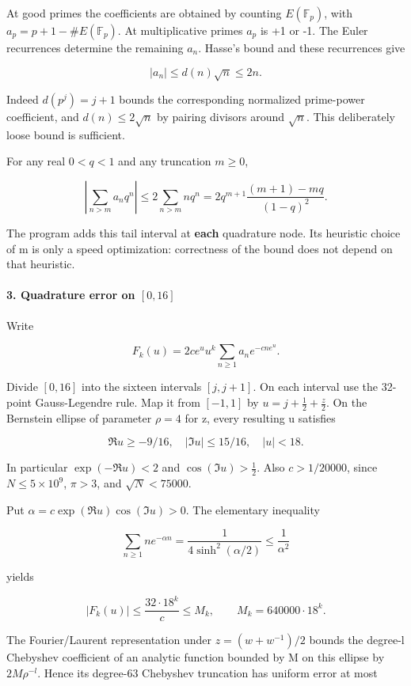 \documentclass[11pt]{article}
\begin{document}
At good primes the coefficients are obtained by counting \(E(\mathbb F_p)\), with \(a_p=p+1-\#E(\mathbb F_p)\). At multiplicative primes \(a_p\) is +1 or -1. The Euler recurrences determine the remaining \(a_n\). Hasse's bound and these recurrences give

\[
|a_n|\le d(n)\sqrt n\le 2n.
\]

Indeed \(d(p^j)=j+1\) bounds the corresponding normalized prime-power coefficient, and \(d(n)\le2\sqrt n\) by pairing divisors around \(\sqrt n\). This deliberately loose bound is sufficient.

For any real \(0<q<1\) and any truncation \(m\ge0\),

\[
\left|\sum_{n>m}a_n q^n\right|
\le 2\sum_{n>m}nq^n
=2q^{m+1}\frac{(m+1)-mq}{(1-q)^2}.
\]

The program adds this tail interval at \textbf{each} quadrature node. Its heuristic choice of m is only a speed optimization: correctness of the bound does not depend on that heuristic.

\paragraph{\texorpdfstring{3. Quadrature error on \([0,16]\)}{3. Quadrature error on {[}0,16{]}}}

Write

\[
F_k(u)=2c e^u u^k\sum_{n\ge1}a_n e^{-cn e^u}.
\]

Divide \([0,16]\) into the sixteen intervals \([j,j+1]\). On each interval use the 32-point Gauss-Legendre rule. Map it from \([-1,1]\) by \(u=j+\frac12+\frac z2\). On the Bernstein ellipse of parameter \(\rho=4\) for z, every resulting u satisfies

\[
\Re u\ge-9/16,\quad |\Im u|\le15/16,\quad |u|<18.
\]

In particular \(\exp(-\Re u)<2\) and \(\cos(\Im u)>\frac12\). Also \(c>1/20000\), since \(N\le5\times10^9\), \(\pi>3\), and \(\sqrt N<75000\).

Put \(\alpha=c\exp(\Re u)\cos(\Im u)>0\). The elementary inequality

\[
\sum_{n\ge1}n e^{-\alpha n}
=\frac1{4\sinh^2(\alpha/2)}\le\frac1{\alpha^2}
\]

yields

\[
|F_k(u)|\le\frac{32\cdot18^k}{c}\le M_k,
\qquad M_k=640000\cdot18^k.
\]

The Fourier/Laurent representation under \(z=(w+w^{-1})/2\) bounds the degree-l Chebyshev coefficient of an analytic function bounded by M on this ellipse by \(2M\rho^{-l}\). Hence its degree-63 Chebyshev truncation has uniform error at most
\end{document}
